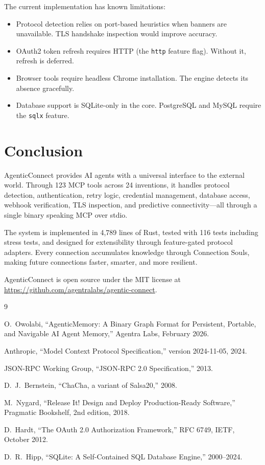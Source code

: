 \documentclass[10pt,twocolumn]{article}
\begin{document}
The current implementation has known limitations:
\begin{itemize}
    \item Protocol detection relies on port-based heuristics when banners are unavailable. TLS handshake inspection would improve accuracy.
    \item OAuth2 token refresh requires HTTP (the \texttt{http} feature flag). Without it, refresh is deferred.
    \item Browser tools require headless Chrome installation. The engine detects its absence gracefully.
    \item Database support is SQLite-only in the core. PostgreSQL and MySQL require the \texttt{sqlx} feature.
\end{itemize}

\section{Conclusion}

AgenticConnect provides AI agents with a universal interface to the external world. Through 123 MCP tools across 24 inventions, it handles protocol detection, authentication, retry logic, credential management, database access, webhook verification, TLS inspection, and predictive connectivity—all through a single binary speaking MCP over stdio.

The system is implemented in 4,789 lines of Rust, tested with 116 tests including stress tests, and designed for extensibility through feature-gated protocol adapters. Every connection accumulates knowledge through Connection Souls, making future connections faster, smarter, and more resilient.

AgenticConnect is open source under the MIT license at \url{https://github.com/agentralabs/agentic-connect}.

\begin{thebibliography}{9}

O.~Owolabi, ``AgenticMemory: A Binary Graph Format for Persistent, Portable, and Navigable AI Agent Memory,'' Agentra Labs, February 2026.

Anthropic, ``Model Context Protocol Specification,'' version 2024-11-05, 2024.

JSON-RPC Working Group, ``JSON-RPC 2.0 Specification,'' 2013.

D.~J.~Bernstein, ``ChaCha, a variant of Salsa20,'' 2008.

M.~Nygard, ``Release It! Design and Deploy Production-Ready Software,'' Pragmatic Bookshelf, 2nd edition, 2018.

D.~Hardt, ``The OAuth 2.0 Authorization Framework,'' RFC 6749, IETF, October 2012.

D.~R.~Hipp, ``SQLite: A Self-Contained SQL Database Engine,'' 2000--2024.

\end{thebibliography}
\end{document}
